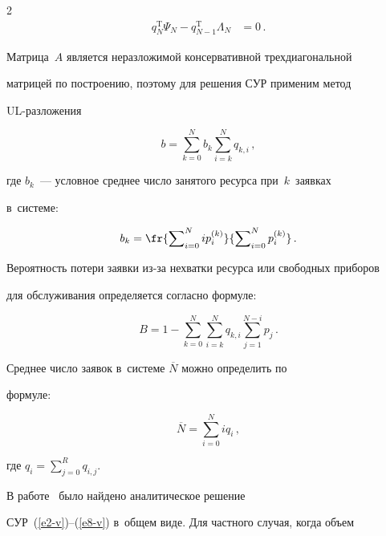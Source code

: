 \begin{multicols}{2}
\begin{align*}
  q_N^{\mathrm{T}} \Psi_N-q_{N-1}^{\mathrm{T}} \Lambda_N&=0\,.

  \end{align*}

  

  Матрица~$A$ является неразложимой консервативной трехдиагональной 

матрицей по по\-стро\-ению, поэтому для решения СУР применим метод  

UL-раз\-ло\-же\-ния~\cite{1-v}

  $$

  b= \sum\limits_{k=0}^N b_k \sum\limits_{i=k}^N q_{k,i}\,,

  $$

  где $b_k$~--- условное среднее число занятого ресурса при~$k$~заявках 

в~системе:

  $$

  b_k= \fr{\sum\nolimits_{i=0}^N i p_i^{(k)}}{\sum\nolimits_{i=0}^N 

p_i^{(k)}}\,.

  $$

  

  Вероятность потери заявки из-за нехватки ресурса или свободных приборов 

для обслуживания определяется согласно формуле:

  \begin{equation}

  B=1-\sum\limits_{k=0}^N \sum\limits_{i=k}^N q_{k,i} \sum\limits_{j=1}^{N-i} 

p_j\,.

  \label{e9-v}

  \end{equation}

  

  Среднее число заявок в~системе $\overline{N}$ можно определить по 

формуле:

  \begin{equation}

  \overline{N} = \sum\limits_{i=0}^N iq_i\,,

  \label{e10-v}

  \end{equation}

где $q_i= \sum\nolimits_{j=0}^R q_{i,j}$.



  В работе~\cite{3-v} было найдено аналитическое решение  

СУР~(\ref{e2-v})--(\ref{e8-v}) в~общем виде. Для частного случая, когда объем 


\end{multicols}
